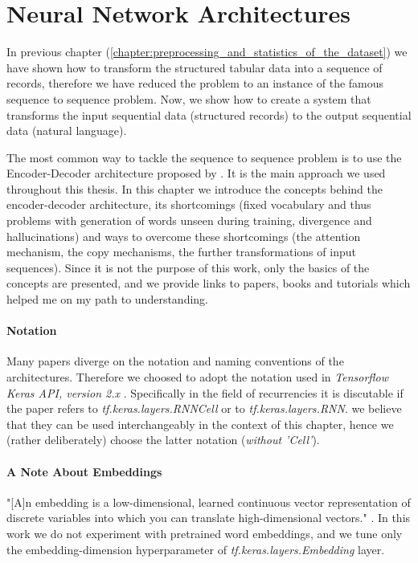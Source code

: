 \chapter{Neural Network Architectures} \label{chapter:neural_network_architectures}
In previous chapter (\ref{chapter:preprocessing_and_statistics_of_the_dataset}) we have shown how to transform the structured tabular data into a sequence of records, therefore we have reduced the problem to an instance of the famous sequence to sequence problem. Now, we show how to create a system that transforms the input sequential data (structured records) to the output sequential data (natural language).

The most common way to tackle the sequence to sequence problem is to use the Encoder-Decoder architecture proposed by \citep{sutskever2014sequence}. It is the main approach we used throughout this thesis. In this chapter we introduce the concepts behind the encoder-decoder architecture, its shortcomings (fixed vocabulary and thus problems with generation of words unseen during training, divergence and hallucinations) and ways to overcome these shortcomings (the attention mechanism, the copy mechanisms, the further transformations of input sequences). Since it is not the purpose of this work, only the basics of the concepts are presented, and we provide links to papers, books and tutorials which helped me on my path to understanding.

\subsubsection{Notation}
Many papers diverge on the notation and naming conventions of the architectures. Therefore we choosed to adopt the notation used in \emph{Tensorflow Keras API, version 2.x} \citep{tensorflow2015-whitepaper}. Specifically in the field of recurrencies it is discutable if the paper refers to \emph{tf.keras.layers.RNNCell} or to \emph{tf.keras.layers.RNN}. we believe that they can be used interchangeably in the context of this chapter, hence we (rather deliberately) choose the latter notation (\emph{without 'Cell'}).

\subsubsection{A Note About Embeddings} \label{subsection:embeddings}

"[A]n embedding is a low-dimensional, learned continuous vector representation of discrete variables into which you can translate high-dimensional vectors." \citep{embeddingDefinition}. In this work we do not experiment with pretrained word embeddings, and we tune only the embedding-dimension hyperparameter of \emph{tf.keras.layers.Em\-bedding} layer.

